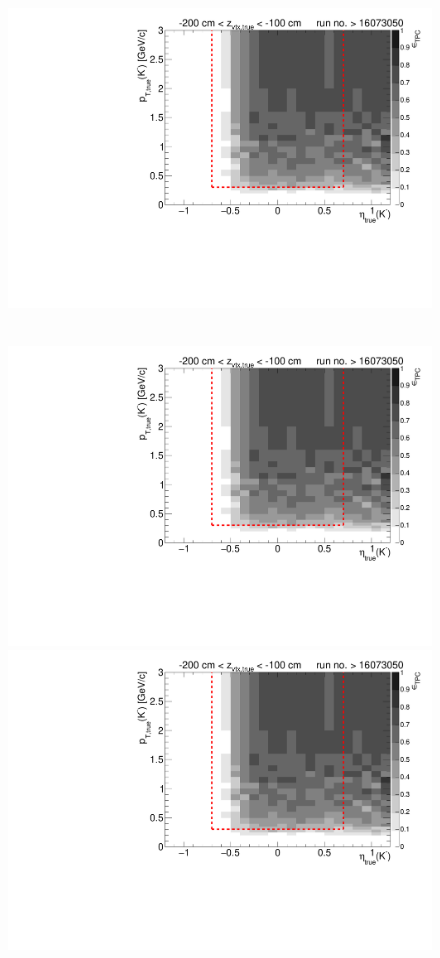 \begin{figure}[hb]
{		\includegraphics[width=\linewidth,page=17]{graphics/eff/Eff2D_TPC_kaon_Minus_RunRange2.pdf}
	}~
	\parbox{0.495\textwidth}{
		\centering
		\includegraphics[width=\linewidth,page=12]{graphics/eff/Eff2D_TPC_kaon_Minus_RunRange2.pdf}\\
		\includegraphics[width=\linewidth,page=14]{graphics/eff/Eff2D_TPC_kaon_Minus_RunRange2.pdf}\\
}
\end{figure}
